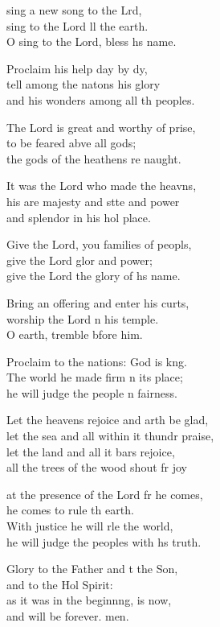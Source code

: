 \settowidth{\versewidth}{let the sea and all within it thunder praise,}
\begin{psalmverse}%
  \begin{patverse}
 sing a new song to the Lrd,\Flex\\
sing to the Lord ll the earth.\Med\\
O sing to the Lord, bless h\pointup{\i}s name.

Proclaim his help day by dy,\Flex\\
tell among the nat\pointup{\i}ons his glory\Med\\
and his wonders among all th peoples.

The Lord is great and worthy of prise,\Flex\\
to be feared abve all gods;\Med\\
the gods of the heathens re naught.

It was the Lord who made the heavns,\Flex\\
his are majesty and stte and power\Med\\
and splendor in his hol place.

Give the Lord, you families of peopls,\Flex\\
give the Lord glor and power;\Med\\
give the Lord the glory of h\pointup{\i}s name.

Bring an offering and enter his curts,\Flex\\
worship the Lord \pointup{\i}n his temple.\Med\\
O earth, tremble bfore him.

Proclaim to the nations: God is k\pointup{\i}ng.\Flex\\
The world he made firm \pointup{\i}n its place;\Med\\
he will judge the people \pointup{\i}n fairness.

Let the heavens rejoice and arth be glad,\Med\\
let the sea and all within it thundr praise,\\
let the land and all it bars rejoice,\Med\\
all the trees of the wood shout fr joy

at the presence of the Lord fr he comes,\Med\\
he comes to rule th earth.\\
With justice he will rle the world,\Med\\
he will judge the peoples with h\pointup{\i}s truth.

Glory to the Father and t the Son,\Med\\
and to the Hol Spirit:\\
as it was in the beginn\pointup{\i}ng, is now,\Med\\
and will be forever. men. 
  \end{patverse}
\end{psalmverse}

